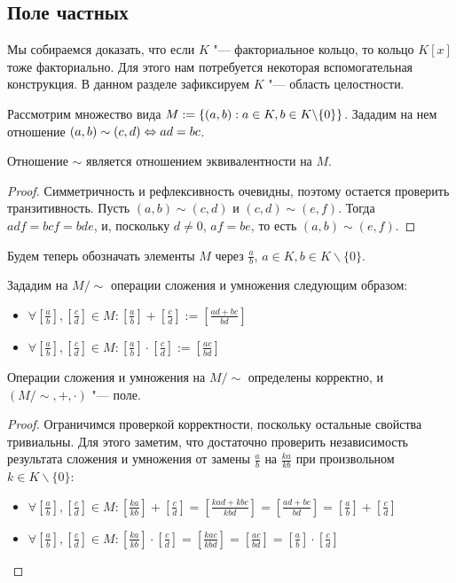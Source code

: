 \subsection{Поле частных}

Мы собираемся доказать, что если $K$ "--- факториальное кольцо, то кольцо $K[x]$ тоже факториально. Для этого нам потребуется некоторая вспомогательная конструкция. В данном разделе зафиксируем $K$ "--- область целостности.

\begin{definition}
	Рассмотрим множество вида $M \hm{:=} \{(a, b) : a \in K, b \in K \backslash \{0\}\}$. Зададим на нем отношение $(a, b) \sim (c, d) \Leftrightarrow ad = bc$.
\end{definition}

\begin{proposition}
	Отношение $\sim$ является отношением эквивалентности на $M$.
\end{proposition}

\begin{proof}
	Симметричность и рефлексивность очевидны, поэтому остается проверить транзитивность. Пусть $(a, b) \sim (c, d)$ и $(c, d) \sim (e, f)$. Тогда $adf = bcf = bde$, и, поскольку $d \ne 0$, $af = be$, то есть $(a, b) \sim (e, f)$.
\end{proof}

Будем теперь обозначать элементы $M$ через $\frac{a}{b}$, $a \in K, b \in K \backslash \{0\}$.

\begin{definition}
	Зададим на $M /{\sim}$ операции сложения и умножения следующим образом:
	\begin{itemize}
		\item $\forall [\frac{a}{b}], [\frac{c}{d}] \in M: [\frac{a}{b}] + [\frac{c}{d}] := [\frac{ad + bc}{bd}]$
		\item $\forall [\frac{a}{b}], [\frac{c}{d}] \in M: [\frac{a}{b}] \cdot [\frac{c}{d}] := [\frac{ac}{bd}]$
	\end{itemize}
\end{definition}

\begin{proposition}
	Операции сложения и умножения на $M /{\sim}$ определены корректно, и $(M/{\sim}, +, \cdot)$ "--- поле.
\end{proposition}

\begin{proof}
	Ограничимся проверкой корректности, поскольку остальные свойства тривиальны. Для этого заметим, что достаточно проверить независимость результата сложения и умножения от замены $\frac ab$ на $\frac{ka}{kb}$ при произвольном $k \in K \backslash \{0\}$:
	\begin{itemize}
		\item $\forall [\frac{a}{b}], [\frac{c}{d}] \in M: [\frac{ka}{kb}] + [\frac{c}{d}] = [\frac{kad + kbc}{kbd}] = [\frac{ad + bc}{bd}] = [\frac{a}{b}] + [\frac{c}{d}]$
		\item $\forall [\frac{a}{b}], [\frac{c}{d}] \in M: [\frac{ka}{kb}] \cdot [\frac{c}{d}] = [\frac{kac}{kbd}] = [\frac{ac}{bd}] = [\frac{a}{b}] \cdot [\frac{c}{d}]$\qedhere
	\end{itemize}
\end{proof}

